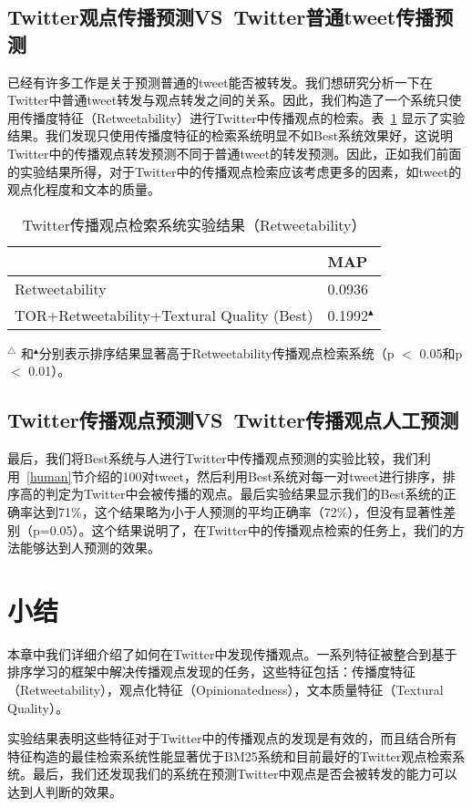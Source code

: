 \subsection{Twitter观点传播预测VS~Twitter普通tweet传播预测}
已经有许多工作是关于预测普通的tweet能否被转发。我们想研究分析一下在Twitter中普通tweet转发与观点转发之间的关系。因此，我们构造了一个系统只使用传播度特征（Retweetability）进行Twitter中传播观点的检索。表~\ref{Human_POR} 显示了实验结果。我们发现只使用传播度特征的检索系统明显不如Best系统效果好，这说明Twitter中的传播观点转发预测不同于普通tweet的转发预测。因此，正如我们前面的实验结果所得，对于Twitter中的传播观点检索应该考虑更多的因素，如tweet的观点化程度和文本的质量。

\begin{table}[!htbp]
 \centering
  \caption{Twitter传播观点检索系统实验结果（Retweetability）}
 \label{Human_POR}
 \begin{tabular}{|l l|}
 \hline
 & MAP \\
 \hline
  Retweetability & 0.0936\\
 TOR+Retweetability+Textural Quality (Best)&0.1992$^\blacktriangle$\\
 \hline
 \end{tabular}
   \begin{tablenotes}
        \footnotesize
\item $^\triangle$ 和$^\blacktriangle$分别表示排序结果显著高于Retweetability传播观点检索系统（p $<$ 0.05和p $<$ 0.01）。
\end{tablenotes}
\end{table}

\subsection{Twitter传播观点预测VS~Twitter传播观点人工预测}
最后，我们将Best系统与人进行Twitter中传播观点预测的实验比较，我们利用~\ref{human}节介绍的100对tweet，然后利用Best系统对每一对tweet进行排序，排序高的判定为Twitter中会被传播的观点。最后实验结果显示我们的Best系统的正确率达到71\%，这个结果略为小于人预测的平均正确率（72\%），但没有显著性差别（p=0.05）。这个结果说明了，在Twitter中的传播观点检索的任务上，我们的方法能够达到人预测的效果。

\section{小结}
本章中我们详细介绍了如何在Twitter中发现传播观点。一系列特征被整合到基于排序学习的框架中解决传播观点发现的任务，这些特征包括：传播度特征（Retweetability），观点化特征（Opinionatedness），文本质量特征（Textural Quality）。

实验结果表明这些特征对于Twitter中的传播观点的发现是有效的，而且结合所有特征构造的最佳检索系统性能显著优于BM25系统和目前最好的Twitter观点检索系统。最后，我们还发现我们的系统在预测Twitter中观点是否会被转发的能力可以达到人判断的效果。
